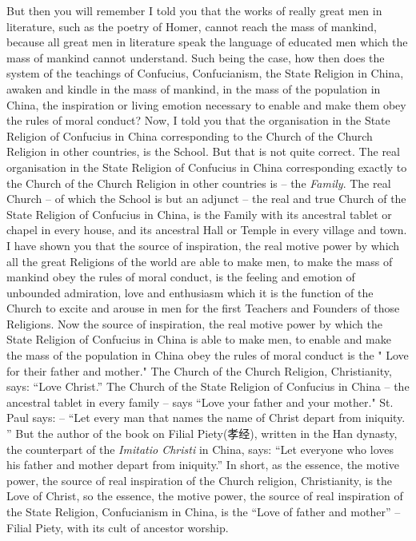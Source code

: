But then you will remember I told you that the works of really great men in literature, such as the poetry of Homer, cannot reach the mass of mankind, because all great men in literature speak the language of educated men which the mass of mankind cannot understand.
Such being the case, how then does the system of the teachings of Confucius, Confucianism, the State Religion in China, awaken and kindle in the mass of mankind, in the mass of the population in China, the inspiration or living emotion necessary to enable and make them obey the rules of moral conduct? Now, I told you that the organisation in the State Religion of Confucius in China corresponding to the Church of the Church Religion in other countries, is the School.
But that is not quite correct.
The real organisation in the State Religion of Confucius in China corresponding exactly to the Church of the Church Religion in other countries is -- the \emph{Family}.
The real Church -- of which the School is but an adjunct
-- the real and true Church of the State Religion of Confucius in China,
is the Family with its ancestral tablet or chapel in every house,
and its ancestral Hall or Temple in every village and town.
I have shown you that the source of inspiration,
the real motive power by which all the great Religions of the world are able to make men,
to make the mass of mankind obey the rules of moral conduct,
is the feeling and emotion of unbounded admiration,
love and enthusiasm which it is the function of the Church to excite and arouse in men for the first Teachers and Founders of those Religions.
Now the source of inspiration, the real motive power by which the State Religion of Confucius in China is able to make men, to enable and make the mass of the population in China obey the rules of moral conduct is the " Love for their father and mother." The Church of the Church Religion, Christianity, says:
``Love Christ.''
The Church of the State Religion of Confucius in China
-- the ancestral tablet in every family
-- says ``Love your father and your mother."
St. Paul says: -- ``Let every man that names the name of Christ depart from iniquity. ''
But the author of the book on Filial Piety(孝经), written in the Han dynasty,
the counterpart of the \emph{Imitatio Christi} in China, says:
``Let everyone who loves his father and mother depart from iniquity.''
In short, as the essence, the motive power,
the source of real inspiration of the Church religion, Christianity,
is the Love of Christ, so the essence, the motive power,
the source of real inspiration of the State Religion,
Confucianism in China, is the ``Love of father and mother''
--  Filial Piety, with its cult of ancestor worship.

